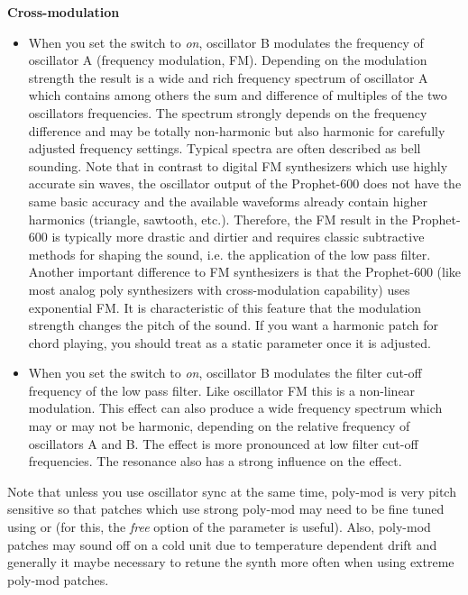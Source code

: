 \textbf{Cross-modulation}

\begin{itemize}
  \item When you set the \polymodfreq switch to \textit{on}, oscillator B modulates the frequency of oscillator A (frequency modulation, FM). Depending on the modulation strength the result is a wide and rich frequency spectrum of oscillator A which contains among others the sum and difference of multiples of the two oscillators frequencies. The spectrum strongly depends on the frequency difference and may be totally non-harmonic but also harmonic for carefully adjusted frequency settings. Typical spectra are often described as bell sounding. Note that in contrast to digital FM synthesizers which use highly accurate sin waves, the oscillator output of the Prophet-600 does not have the same basic accuracy and the available waveforms already contain higher harmonics (triangle, sawtooth, etc.). Therefore, the FM result in the Prophet-600 is typically more drastic and dirtier and requires classic subtractive methods for shaping the sound, i.e. the application of the low pass filter. Another important difference to FM synthesizers is that the Prophet-600 (like most analog poly synthesizers with cross-modulation capability) uses exponential FM. It is characteristic of this feature that the modulation strength changes the pitch of the sound. If you want a harmonic patch for chord playing, you should treat \polymodosc as a static parameter once it is adjusted.
  \item When you set the \polymodfilter switch to \textit{on}, oscillator B modulates the filter cut-off frequency of the low pass filter. Like oscillator FM this is a non-linear modulation. This effect can also produce a wide frequency spectrum which may or may not be harmonic, depending on the relative frequency of oscillators A and B. The effect is more pronounced at low filter cut-off frequencies. The resonance also has a strong influence on the effect.  
\end{itemize}

Note that unless you use oscillator sync at the same time, poly-mod is very pitch sensitive so that patches which use strong poly-mod may need to be fine tuned using \freqfine or \oscfreq (for this, the \textit{free} option of the parameter \oscpitchmode is useful). Also, poly-mod patches may sound off on a cold unit due to temperature dependent drift and generally it maybe necessary to retune the synth more often when using extreme poly-mod patches. 

